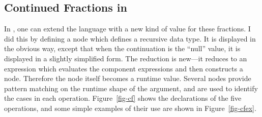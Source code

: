 \subsection{Continued Fractions in \Meta}
In \Meta, one can extend the language with a new kind of value for these fractions. I did this by defining a  node which defines a recursive data type. It is displayed in the obvious way, except that when the continuation is the ``null'' value, it is displayed in a slightly simplified form. The  reduction is new---it reduces to an expression which evaluates the component expressions and then constructs a node. Therefore the node itself becomes a runtime value. Several  nodes provide pattern matching on the runtime shape of the argument, and are used to identify the cases in each operation. Figure~\ref{fig-cf} shows the declarations of the five operations, and some simple examples of their use are shown in Figure~\ref{fig-cfex}.
